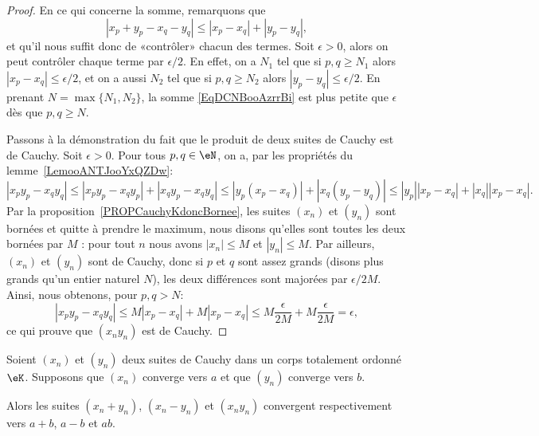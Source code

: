 \begin{proof}
  En ce qui concerne la somme, remarquons que
  \begin{equation}        \label{EqDCNBooAzrrBi}
    | x_p+y_p-x_q-y_q |\leq | x_p-x_q |+| y_p-y_q |,
  \end{equation}
  et qu'il nous suffit donc de «contrôler» chacun des termes. Soit \( \epsilon > 0 \), alors on peut contrôler chaque terme par \( \epsilon / 2 \). En effet, on a \( N_1\) tel que si \( p,q\geq N_1\) alors \( | x_p-x_q |\leq \epsilon/2\), et on a aussi \( N_2\) tel que si \( p,q\geq N_2\) alors \( | y_p-y_q |\leq \epsilon/2\). En prenant \( N=\max\{ N_1,N_2 \}\), la somme \eqref{EqDCNBooAzrrBi} est plus petite que \(\epsilon\) dès que \( p,q\geq N\).

  Passons à la démonstration du fait que le produit de deux suites de Cauchy est de Cauchy. Soit \( \epsilon > 0 \). Pour tous \(p, q \in \eN \), on a, par les propriétés du lemme~\ref{LemooANTJooYxQZDw}:
            \begin{equation}
                | x_py_p-x_qy_q |\leq | x_py_p-x_qy_p |+| x_qy_p-x_qy_q |\leq | y_p (x_p-x_q) |+| x_q(y_p-y_q) | \leq | y_p| |x_p-x_q| + | x_q | |x_p-x_q|.
            \end{equation}
            Par la proposition~\ref{PROPCauchyKdoncBornee}, les suites \( (x_n)\) et \( (y_n)\) sont bornées et quitte à prendre le maximum, nous disons qu'elles sont toutes les deux bornées par \( M\) : pour tout \( n\) nous avons \( | x_n |\leq M\) et \( | y_n |\leq M\). Par ailleurs, \( (x_n)\) et \( (y_n)\) sont de Cauchy, donc si \( p\) et \( q\) sont assez grands (disons plus grands qu'un entier naturel \( N \)), les deux différences sont majorées par \( \epsilon / 2M\). Ainsi, nous obtenons, pour \( p, q > N \):
            \begin{equation}
              | x_py_p-x_qy_q |  \leq  M |x_p-x_q| + M |x_p-x_q|
              \leq M \frac \epsilon{2M}+M\frac \epsilon{2M} =\epsilon,
            \end{equation}
            ce qui prouve que \( (x_ny_n)\) est de Cauchy.
\end{proof}

\begin{proposition}
   Soient \( (x_n)\) et \( (y_n)\) deux suites de Cauchy dans un corps totalement ordonné \( \eK \). Supposons que \((x_n)\) converge vers \(a\) et que \( (y_n) \) converge vers \( b \).

   Alors les suites \( (x_n+y_n)\), \( (x_n-y_n)\) et  \( (x_ny_n)\) convergent respectivement vers \( a+b \), \( a - b \) et \( ab\).
\end{proposition}

